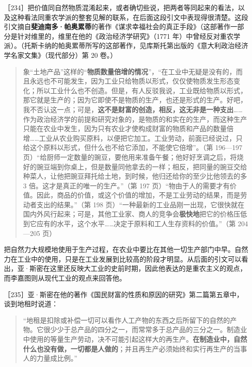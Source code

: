 
［234］把价值同自然物质混淆起来，或者确切些说，把两者等同起来的看法，以及这种看法同重农学派的整套见解的联系，在后面这段引文中表现得很清楚。这段引文摘自\textbf{斐迪南多·帕奥累蒂}的著作《谋求幸福社会的真正手段》（这部著作一部分是针对维里的，维里在他的《政治经济学研究》（1771 年）中曾经反对重农学派）。（托斯卡纳的帕奥累蒂所写的这部著作，见库斯托第出版的《意大利政治经济学名家文集》（现代部分）第 20 卷。）

\begin{quote}象“土地产品”这样的“\textbf{物质数量倍增的情况}”，“在工业中无疑是没有的，而且永远也不可能发生，因为工业只给物质以形式，仅仅使物质发生形态变化；所以工业什么也不创造。但是，有人反驳我说，工业既给物质以形式，那它就是生产的；因为它即使不是物质的生产，也还是形式的生产。好吧，我不否认这一点；可是，\textbf{这不是财富的创造，相反，这无非是一种支出}……作为政治经济学的前提和研究对象的，是物质的和实在的生产，而这种生产只能在农业中发生，因为只有农业才使构成财富的物质和产品的数量倍增……工业从农业购买原料，以便把它加工。工业劳动，前面已经说过，只给这个原料以形式，但什么也不给它添加，不能使它倍增”。（第 196—197 页）“给厨师一定数量的豌豆，要他用来准备午餐；他好好烹调之后，将烧好的豌豆端到你桌上，但是数量同他拿去的一样；相反，把同量的豌豆交给种菜人，让他把豌豆拜托给土地，到时候，他归还给你的至少比他领去的多 3 倍。这才是真正的唯一的生产。”（第 197 页）“物由于人的需要才有价值。因此，商品的价值，或这个价值的增加，不是工业劳动的结果，而是劳动者支出的结果。”（第 198 页）“一种最新的工业品刚一出现，它很快就在国内外风行起来；可是，其他工业家、商人的竞争会\textbf{极快地}把它的价格压低到它应有的水平，这个水平……决定于原料和工人生存资料的价值。”（第 204—205 页）\end{quote}


把自然力大规模地使用于生产过程，在农业中要比在其他一切生产部门中早。自然力在工业中的使用，只是在工业发展到比较高的阶段才明显。从后面的引文可以看出，亚·斯密在这里还反映大工业的史前时期，因此他表达的是重农主义的观点，而李嘉图则从现代工业的观点来回答他。

［235］亚·斯密在他的著作《国民财富的性质和原因的研究》第二篇第五章中，谈到地租时说道：

\begin{quote}“地租是扣除或补偿一切可以看作人工产物的东西之后所留下的自然的产物。它很少少于总产品的四分之一，而常常多于总产品的三分之一。制造业中使用的等量生产劳动，决不可能引起这样大的再生产。\textbf{在制造业中，自然什么也没有做，一切都是人做的}；并且再生产必须始终和实行再生产的当事人的力量成比例。”\end{quote}

